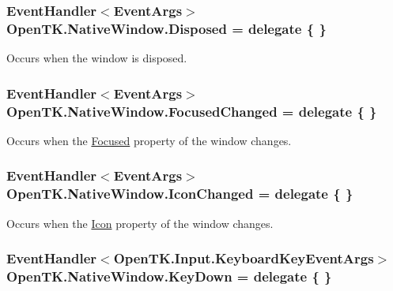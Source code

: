 \hypertarget{class_open_t_k_1_1_native_window_a28187250dc87ba3b721177cd78f8e52b}{
\subsubsection[{Disposed}]{\setlength{\rightskip}{0pt plus 5cm}Event\-Handler$<$Event\-Args$>$ Open\-T\-K.\-Native\-Window.\-Disposed = delegate \{ \}}}\label{class_open_t_k_1_1_native_window_a28187250dc87ba3b721177cd78f8e52b}


Occurs when the window is disposed. 

\hypertarget{class_open_t_k_1_1_native_window_ab499521edced0c062b37a01eefecaf4a}{
\subsubsection[{Focused\-Changed}]{\setlength{\rightskip}{0pt plus 5cm}Event\-Handler$<$Event\-Args$>$ Open\-T\-K.\-Native\-Window.\-Focused\-Changed = delegate \{ \}}}\label{class_open_t_k_1_1_native_window_ab499521edced0c062b37a01eefecaf4a}


Occurs when the \hyperlink{class_open_t_k_1_1_native_window_ad68c0c086e7733e7a55745425c4faf5d}{Focused} property of the window changes. 

\hypertarget{class_open_t_k_1_1_native_window_a585aeb8c100ea173db497c287def293b}{
\subsubsection[{Icon\-Changed}]{\setlength{\rightskip}{0pt plus 5cm}Event\-Handler$<$Event\-Args$>$ Open\-T\-K.\-Native\-Window.\-Icon\-Changed = delegate \{ \}}}\label{class_open_t_k_1_1_native_window_a585aeb8c100ea173db497c287def293b}


Occurs when the \hyperlink{class_open_t_k_1_1_native_window_a6cb12235c07f51662905a238baf65f2d}{Icon} property of the window changes. 

\hypertarget{class_open_t_k_1_1_native_window_aba78b8d5243523c3ebb373cc2ab564db}{
\subsubsection[{Key\-Down}]{\setlength{\rightskip}{0pt plus 5cm}Event\-Handler$<${\bf Open\-T\-K.\-Input.\-Keyboard\-Key\-Event\-Args}$>$ Open\-T\-K.\-Native\-Window.\-Key\-Down = delegate \{ \}}}\label{class_open_t_k_1_1_native_window_aba78b8d5243523c3ebb373cc2ab564db}


